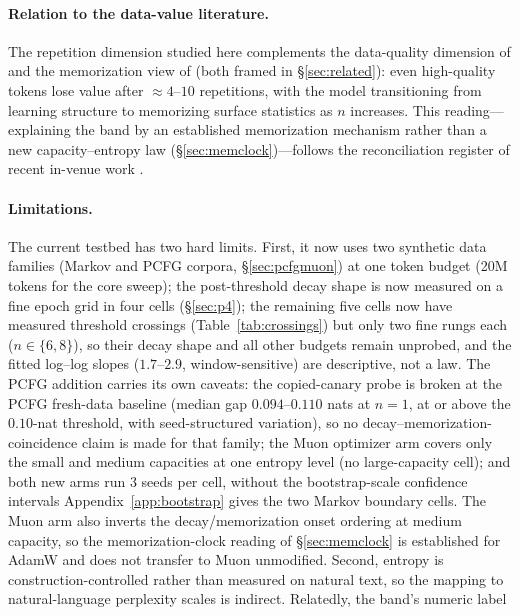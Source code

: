 \documentclass[11pt]{article}
\begin{document}
\paragraph{Relation to the data-value literature.}
The repetition dimension studied here complements the data-quality dimension of
\citet{sorscher2022beyond} and the memorization view of \citet{feldman2020longtail}
(both framed in \S\ref{sec:related}): even high-quality tokens lose value after
$\approx 4$--$10$ repetitions, with the model transitioning from learning structure to
memorizing surface statistics as $n$ increases. This reading---explaining the band by an
established memorization mechanism rather than a new capacity--entropy law
(\S\ref{sec:memclock})---follows the reconciliation register of recent in-venue work
\citep{neucom2026grokking}.

\paragraph{Limitations.}
\label{sec:limitations}
The current testbed has two hard limits. First, it now uses two synthetic data
families (Markov and PCFG corpora, \S\ref{sec:pcfgmuon}) at one token budget (20M
tokens for the core sweep); the post-threshold decay shape is now measured on a
fine epoch grid in four cells (\S\ref{sec:p4}); the remaining five cells now have
measured threshold crossings (Table~\ref{tab:crossings}) but only two fine rungs
each ($n\in\{6,8\}$), so their decay shape and all other budgets remain unprobed,
and the fitted log--log slopes ($1.7$--$2.9$,
window-sensitive) are descriptive, not a law. The PCFG addition carries its own
caveats: the copied-canary probe is broken at the PCFG fresh-data baseline (median
gap $0.094$--$0.110$ nats at $n{=}1$, at or above the $0.10$-nat threshold, with
seed-structured variation), so no decay--memorization-coincidence claim is made for
that family; the Muon optimizer arm covers only the small and medium capacities at
one entropy level (no large-capacity cell); and both new arms run 3 seeds per cell,
without the bootstrap-scale confidence intervals Appendix~\ref{app:bootstrap} gives
the two Markov boundary cells. The Muon arm also inverts the decay/memorization
onset ordering at medium capacity, so the memorization-clock reading of
\S\ref{sec:memclock} is established for AdamW and does not transfer to Muon
unmodified. Second,
entropy is
construction-controlled rather than measured on natural text, so the mapping to
natural-language perplexity scales is indirect. Relatedly, the band's numeric label
\end{document}
